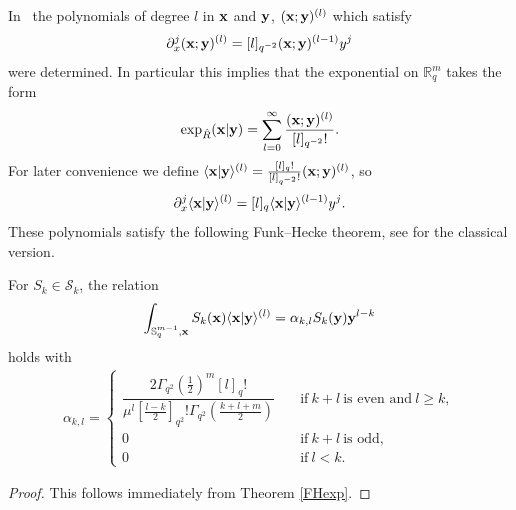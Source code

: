 \documentclass[pdftex]{sigma}
\newcommand{\mR}{\mathbb{R}}
\newcommand{\mS}{\mathbb{S}}
\newcommand{\cS}{\mathcal{S}}
\numberwithin{equation}{section}
\begin{document}
In~\cite{MR1317458} the polynomials of degree $l$ in $\bold{x}$ and $\bold{y}$, $(\bold{x};\bold{y})^{(l)}$ which satisfy
\[
\partial_x^j(\bold{x};\bold{y})^{(l)}=[l]_{q^{-2}}(\bold{x};\bold{y})^{(l-1)}y^j
 \]
 were determined. In particular this implies that the exponential on $\mR^m_q$ takes the form
\begin{gather*}
\exp_{\hat{R}}(\bold{x}|\bold{y}) = \sum_{l=0}^\infty \frac{(\bold{x};\bold{y})^{(l)}}{[l]_{q^{-2}}!}.
\end{gather*}
For later convenience we def\/ine $\langle \bold{x}|\bold{y}\rangle^{(l)}=\frac{[l]_q!}{[l]_{q^{-2}}!}(\bold{x};\bold{y})^{(l)}$, so
\begin{gather*}
\partial_x^j\langle \bold{x}|\bold{y}\rangle^{(l)} = [l]_{q}\langle \bold{x}|\bold{y}\rangle^{(l-1)}y^j.
\end{gather*}
These polynomials satisfy the following Funk--Hecke theorem, see \cite{MR0499342} for the classical version.
\begin{theorem}
\label{FHthm}
For $S_k\in\cS_k$, the relation
\begin{gather*}
\int_{\mS^{m-1}_q,\bold{x}}S_k(\bold{x})\langle \bold{x}|\bold{y}\rangle^{(l)} = \alpha_{k,l}S_k(\bold{y}) \bold{y}^{l-k}
\end{gather*}
holds with
\begin{gather*}
\alpha_{k,l} = \begin{cases}
\dfrac{2\Gamma_{q^2}(\frac{1}{2})^m[l]_q!}{\mu^l\left[\frac{l-k}{2}\right]_{q^2}!\Gamma_{q^2}\left(\frac{k+l+m}{2}\right)}\quad & \mbox{if} \ k+l \ \mbox{is  even and} \  l\ge k,\\
 0 \quad & \mbox{if} \ k+l \ \mbox{is odd},\\
 0\quad & \mbox{if} \ l<k.
 \end{cases}
\end{gather*}
\end{theorem}
\begin{proof}
This follows immediately from Theorem \ref{FHexp}.
\end{proof}
\end{document}
